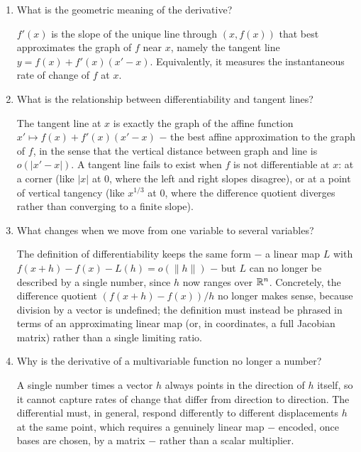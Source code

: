 \documentclass{essay}
\begin{document}
\begin{enumerate}[leftmargin=*, itemsep=8pt]
\item What is the geometric meaning of the derivative?
\begin{answer}
\(f'(x)\) is the slope of the unique line through \((x,f(x))\) that best approximates the graph of \(f\) near \(x\), namely the tangent line \(y=f(x)+f'(x)(x'-x)\). Equivalently, it measures the instantaneous rate of change of \(f\) at \(x\).
\end{answer}

\item What is the relationship between differentiability and tangent lines?
\begin{answer}
The tangent line at \(x\) is exactly the graph of the affine function \(x'\mapsto f(x)+f'(x)(x'-x)\) \(-\) the best affine approximation to the graph of \(f\), in the sense that the vertical distance between graph and line is \(o(|x'-x|)\). A tangent line fails to exist when \(f\) is not differentiable at \(x\): at a corner (like \(|x|\) at \(0\), where the left and right slopes disagree), or at a point of vertical tangency (like \(x^{1/3}\) at \(0\), where the difference quotient diverges rather than converging to a finite slope).
\end{answer}

\item What changes when we move from one variable to several variables?
\begin{answer}
The definition of differentiability keeps the same form \(-\) a linear map \(L\) with \(f(x+h)-f(x)-L(h)=o(\|h\|)\) \(-\) but \(L\) can no longer be described by a single number, since \(h\) now ranges over \(\mathbb{R}^n\). Concretely, the difference quotient \((f(x+h)-f(x))/h\) no longer makes sense, because division by a vector is undefined; the definition must instead be phrased in terms of an approximating linear map (or, in coordinates, a full Jacobian matrix) rather than a single limiting ratio.
\end{answer}

\item Why is the derivative of a multivariable function no longer a number?
\begin{answer}
A single number times a vector \(h\) always points in the direction of \(h\) itself, so it cannot capture rates of change that differ from direction to direction. The differential must, in general, respond differently to different displacements \(h\) at the same point, which requires a genuinely linear map \(-\) encoded, once bases are chosen, by a matrix \(-\) rather than a scalar multiplier.
\end{answer}


\end{enumerate}
\end{document}
